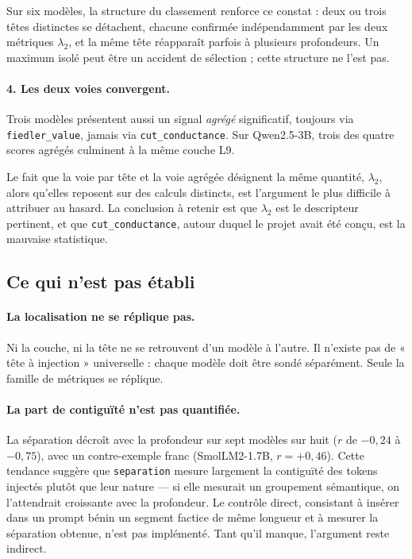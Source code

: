\documentclass[11pt,a4paper]{article}
\begin{document}
Sur six modèles, la structure du classement renforce ce constat : deux ou trois
têtes distinctes se détachent, chacune confirmée indépendamment par les deux
métriques $\lambda_2$, et la même tête réapparaît parfois à plusieurs
profondeurs. Un maximum isolé peut être un accident de sélection ; cette
structure ne l'est pas.

\paragraph{4. Les deux voies convergent.}
Trois modèles présentent aussi un signal \emph{agrégé} significatif, toujours
via \texttt{fiedler\_value}, jamais via \texttt{cut\_conductance}. Sur
Qwen2.5-3B, trois des quatre scores agrégés culminent à la même couche L9.

Le fait que la voie par tête et la voie agrégée désignent la même quantité,
$\lambda_2$, alors qu'elles reposent sur des calculs distincts, est l'argument
le plus difficile à attribuer au hasard. La conclusion à retenir est que
$\lambda_2$ est le descripteur pertinent, et que \texttt{cut\_conductance},
autour duquel le projet avait été conçu, est la mauvaise statistique.

\subsection{Ce qui n'est pas établi}

\paragraph{La localisation ne se réplique pas.} Ni la couche, ni la tête ne se
retrouvent d'un modèle à l'autre. Il n'existe pas de « tête à injection »
universelle : chaque modèle doit être sondé séparément. Seule la famille de
métriques se réplique.

\paragraph{La part de contiguïté n'est pas quantifiée.} La séparation décroît
avec la profondeur sur sept modèles sur huit ($r$ de $-0{,}24$ à $-0{,}75$),
avec un contre-exemple franc (SmolLM2-1.7B, $r = +0{,}46$). Cette tendance
suggère que \texttt{separation} mesure largement la contiguïté des tokens
injectés plutôt que leur nature --- si elle mesurait un groupement sémantique,
on l'attendrait croissante avec la profondeur. Le contrôle direct, consistant à
insérer dans un prompt bénin un segment factice de même longueur et à mesurer
la séparation obtenue, n'est pas implémenté. Tant qu'il manque, l'argument
reste indirect.
\end{document}
